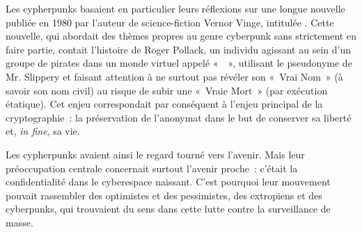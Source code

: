 Les cypherpunks basaient en particulier leurs réflexions sur une longue nouvelle publiée en 1980 par l'auteur de science-fiction Vernor Vinge, intitulée . Cette nouvelle, qui abordait des thèmes propres au genre cyberpunk sans strictement en faire partie, contait l'histoire de Roger Pollack, un individu agissant au sein d'un groupe de pirates dans un monde virtuel appelé «~~», utilisant le pseudonyme de Mr. Slippery et faisant attention à ne surtout pas révéler son «~Vrai Nom~» (à savoir son nom civil) au risque de subir une «~Vraie Mort~» (par exécution étatique). Cet enjeu correspondait par conséquent à l'enjeu principal de la cryptographie~: la préservation de l'anonymat dans le but de conserver sa liberté et, \emph{in fine}, sa vie. %

\clearpage
Les cypherpunks avaient ainsi le regard tourné vers l'avenir. Mais leur préoccupation centrale concernait surtout l'avenir proche~: c'était la confidentialité dans le cyberespace naissant. C'est pourquoi leur mouvement pouvait rassembler des optimistes et des pessimistes, des extropiens et des cyberpunks, qui trouvaient du sens dans cette lutte contre la surveillance de masse.

